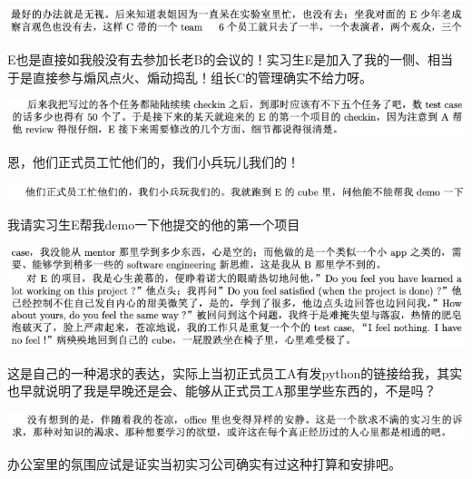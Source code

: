 \documentclass[9pt, b5paper]{article}
\begin{document}
\begin{center}
\includegraphics[width=.9\linewidth]{./pic/backups_plans_20210507_095131.png}
\end{center}

E也是直接如我般没有去参加长老B的会议的！实习生E是加入了我的一侧、相当于是直接参与煽风点火、煽动捣乱！组长C的管理确实不给力呀。 

\begin{center}
\includegraphics[width=.9\linewidth]{./pic/backups_plans_20210507_094737.png}
\end{center}

恩，他们正式员工忙他们的，我们小兵玩儿我们的！

\begin{center}
\includegraphics[width=.9\linewidth]{./pic/backups_plans_20210507_104400.png}
\end{center}

我请实习生E帮我demo一下他提交的他的第一个项目

\begin{center}
\includegraphics[width=.9\linewidth]{./pic/backups_plans_20210507_104525.png}
\end{center}

这是自己的一种渴求的表达，实际上当初正式员工A有发python的链接给我，其实也早就说明了我是早晚还是会、能够从正式员工A那里学些东西的，不是吗？

\begin{center}
\includegraphics[width=.9\linewidth]{./pic/backups_plans_20210507_104827.png}
\end{center}

办公室里的氛围应试是证实当初实习公司确实有过这种打算和安排吧。 
\end{document}
